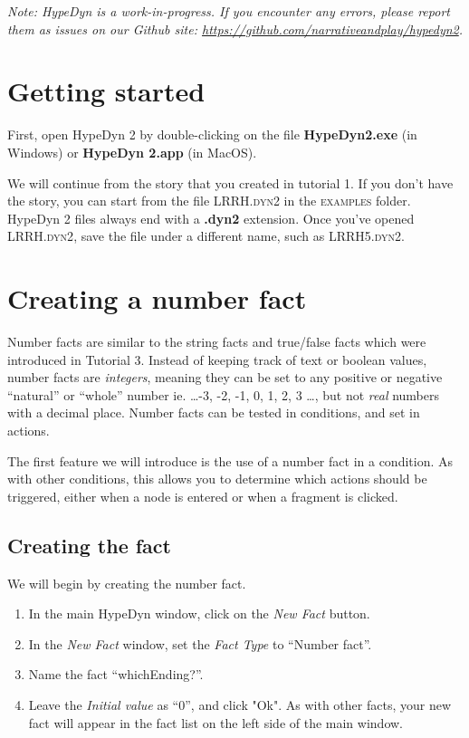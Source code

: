 \documentclass{article}
\begin{document}
\textit{Note:  HypeDyn is a work-in-progress. If you encounter any errors, please report them as issues on our Github site: \url{https://github.com/narrativeandplay/hypedyn2}.}

\section{Getting started}

First, open HypeDyn 2 by double-clicking on the file \textbf{HypeDyn2.exe} (in Windows) or \textbf{HypeDyn 2.app} (in MacOS).

We will continue from the story that you created in tutorial 1. If you don't have the story, you can start from the file \textsc{LRRH.dyn2} in the \textsc{examples} folder. HypeDyn 2 files always end with a \textbf{.dyn2} extension. Once you've opened \textsc{LRRH.dyn2}, save the file under a different name, such as \textsc{LRRH5.dyn2}.

\section{Creating a number fact}

Number facts are similar to the string facts and true/false facts which 
were introduced in Tutorial 3. Instead of keeping track of text or 
boolean values, number facts are \textit{integers}, meaning they can be set  to any positive or negative ``natural'' or ``whole'' number ie. \dots -3, -2, -1, 0, 1, 2, 3 \dots, but not \textit{real} numbers with a 
decimal place. Number facts can be tested in conditions, and set in 
actions.

The first feature we will introduce is the use of a number fact in a condition. As with other conditions, this allows you to determine which actions should be triggered, either when a node is entered or when a fragment is clicked.

\subsection{Creating the fact}

We will begin by creating the number fact.

\begin{enumerate}
  \item In the main HypeDyn window, click on the \textit{New Fact} button.
  \item In the \textit{New Fact} window, set the \textit{Fact Type} to ``Number fact''.
  \item Name the fact ``whichEnding?''.
  \item Leave the \textit{Initial value} as ``0'', and click "Ok". As with other  facts, your new fact will appear in the fact list on the  left side of the main window.  
\end{enumerate}
\end{document}
